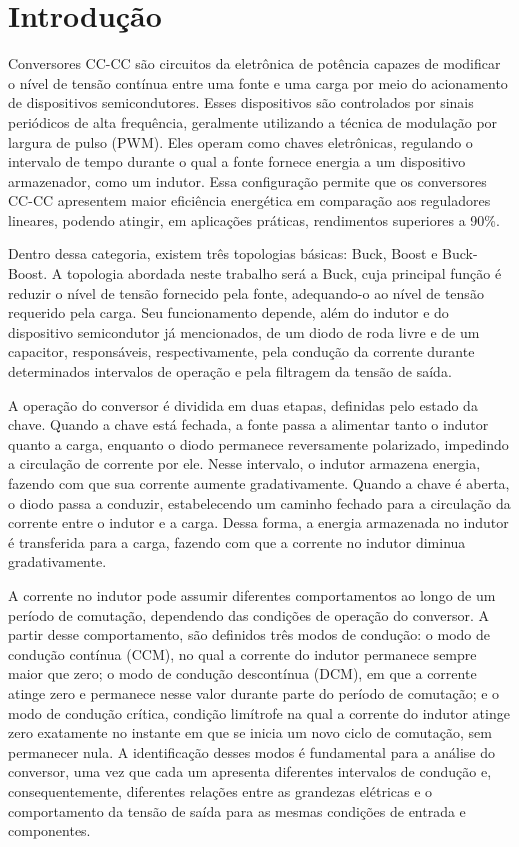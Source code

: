 \section{Introdução} %

Conversores CC-CC são circuitos da eletrônica de potência capazes de modificar o nível de tensão contínua entre uma fonte e uma carga por meio do acionamento de dispositivos semicondutores. Esses dispositivos são controlados por sinais periódicos de alta frequência, geralmente utilizando a técnica de modulação por largura de pulso (PWM). Eles operam como chaves eletrônicas, regulando o intervalo de tempo durante o qual a fonte fornece energia a um dispositivo armazenador, como um indutor. Essa configuração permite que os conversores CC-CC apresentem maior eficiência energética em comparação aos reguladores lineares, podendo atingir, em aplicações práticas, rendimentos superiores a 90\%.

Dentro dessa categoria, existem três topologias básicas: Buck, Boost e Buck-Boost. A topologia abordada neste trabalho será a Buck, cuja principal função é reduzir o nível de tensão fornecido pela fonte, adequando-o ao nível de tensão requerido pela carga. Seu funcionamento depende, além do indutor e do dispositivo semicondutor já mencionados, de um diodo de roda livre e de um capacitor, responsáveis, respectivamente, pela condução da corrente durante determinados intervalos de operação e pela filtragem da tensão de saída.

A operação do conversor é dividida em duas etapas, definidas pelo estado da chave. Quando a chave está fechada, a fonte passa a alimentar tanto o indutor quanto a carga, enquanto o diodo permanece reversamente polarizado, impedindo a circulação de corrente por ele. Nesse intervalo, o indutor armazena energia, fazendo com que sua corrente aumente gradativamente. Quando a chave é aberta, o diodo passa a conduzir, estabelecendo um caminho fechado para a circulação da corrente entre o indutor e a carga. Dessa forma, a energia armazenada no indutor é transferida para a carga, fazendo com que a corrente no indutor diminua gradativamente.

A corrente no indutor pode assumir diferentes comportamentos ao longo de um período de comutação, dependendo das condições de operação do conversor. A partir desse comportamento, são definidos três modos de condução: o modo de condução contínua (CCM), no qual a corrente do indutor permanece sempre maior que zero; o modo de condução descontínua (DCM), em que a corrente atinge zero e permanece nesse valor durante parte do período de comutação; e o modo de condução crítica, condição limítrofe na qual a corrente do indutor atinge zero exatamente no instante em que se inicia um novo ciclo de comutação, sem permanecer nula. A identificação desses modos é fundamental para a análise do conversor, uma vez que cada um apresenta diferentes intervalos de condução e, consequentemente, diferentes relações entre as grandezas elétricas e o comportamento da tensão de saída para as mesmas condições de entrada e componentes.

